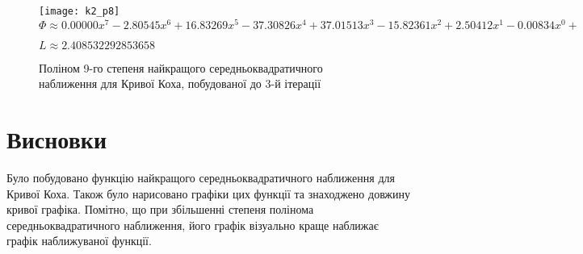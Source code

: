 \documentclass[12pt,a4paper]{article}
\begin{document}
\begin{figure}[!ht]
	\caption{Поліном 9-го степеня найкращого середньоквадратичного наближення для Кривої Коха, побудованої до 3-й ітерації}
	\centering
   	\texttt{[image: k2\_p8]}
	$\Phi \approx 0.00000x^7 -2.80545x^6 +16.83269x^5 -37.30826x^4 +37.01513x^3 -15.82361x^2 +2.50412x^1 -0.00834x^0 + $ \par	
	$L  \approx 2.408532292853658$
\end{figure}	

\section{Висновки}
Було побудовано функцію найкращого середньоквадратичного наближення для Кривої Коха. Також було нарисовано графіки цих функції та знаходжено довжину кривої графіка. Помітно, що при збільшенні степеня полінома середньоквадратичного наближення, його графік візуально краще наближає графік наближуваної функції.
\end{document}
